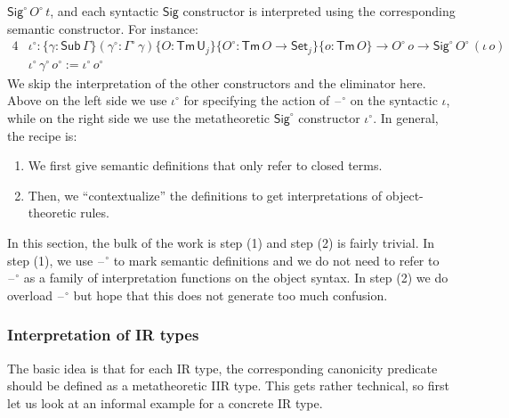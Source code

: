 \documentclass[acmsmall,screen,review,anonymous]{acmart}
\newcommand{\msf}[1]{{\mathsf{#1}}}
\newcommand{\U}{\msf{U}}
\newcommand{\Set}{\msf{Set}}
\newcommand{\Sig}{\msf{Sig}}
\newcommand{\blank}{{\mathord{\hspace{1pt}\text{--}\hspace{1pt}}}}
\newcommand{\Sub}{\msf{Sub}}
\newcommand{\Tm}{\msf{Tm}}
\newcommand{\w}{\circ}
\begin{document}
$\Sig^\w\,O^\w\,t$, and each syntactic $\Sig$ constructor is interpreted using the corresponding
semantic constructor. For instance:
\begin{alignat*}{4}
  &\iota^\w : \{\gamma : \Sub\,\Gamma\}(\gamma^\w : \Gamma^\w\,\gamma)\{O : \Tm\,\U_j\}\{O^\w : \Tm\,O \to \Set_j\}\{o : \Tm\,O\} \to O^\w\,o \to \Sig^\w\,O^\w\,(\iota\,o)\\
  &\iota^\w\,\gamma^\w\,o^\w := \iota^\w\,o^\w
\end{alignat*}
We skip the interpretation of the other constructors and the eliminator here. Above on the left side
we use $\iota^\w$ for specifying the action of $\blank^\w$ on the syntactic $\iota$, while on the
right side we use the metatheoretic $\Sig^\w$ constructor $\iota^\w$. In general, the recipe is:
\begin{enumerate}
\item We first give semantic definitions that only refer to closed terms.
\item Then, we ``contextualize'' the definitions to get interpretations of object-theoretic rules.
\end{enumerate}
In this section, the bulk of the work is step (1) and step (2) is fairly trivial. In step (1), we
use $\blank^\w$ to mark semantic definitions and we do not need to refer to $\blank^\w$ as a family
of interpretation functions on the object syntax. In step (2) we do overload $\blank^\w$ but hope
that this does not generate too much confusion.

\subsubsection{Interpretation of IR types}\label{sec:ir-canonicity}

The basic idea is that for each IR type, the corresponding canonicity predicate should be defined as
a metatheoretic IIR type. This gets rather technical, so first let us look at an informal example
for a concrete IR type.
\end{document}
